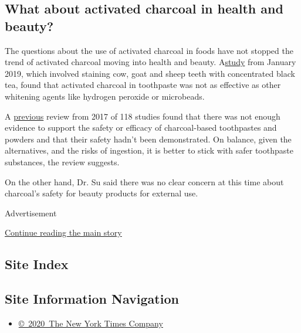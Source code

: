 \hypertarget{what-about-activated-charcoal-in-health-and-beauty}{%
\subsection{What about activated charcoal in health and
beauty?}\label{what-about-activated-charcoal-in-health-and-beauty}}

The questions about the use of activated charcoal in foods have not
stopped the trend of activated charcoal moving into health and beauty.
A\href{https://www.ncbi.nlm.nih.gov/pubmed/30673027}{study} from January
2019, which involved staining cow, goat and sheep teeth with
concentrated black tea, found that activated charcoal in toothpaste was
not as effective as other whitening agents like hydrogen peroxide or
microbeads.

A \href{https://www.ncbi.nlm.nih.gov/pubmed/28599961}{previous} review
from 2017 of 118 studies found that there was not enough evidence to
support the safety or efficacy of charcoal-based toothpastes and powders
and that their safety hadn't been demonstrated. On balance, given the
alternatives, and the risks of ingestion, it is better to stick with
safer toothpaste substances, the review suggests.

On the other hand, Dr. Su said there was no clear concern at this time
about charcoal's safety for beauty products for external use.

Advertisement

\protect\hyperlink{after-bottom}{Continue reading the main story}

\hypertarget{site-index}{%
\subsection{Site Index}\label{site-index}}

\hypertarget{site-information-navigation}{%
\subsection{Site Information
Navigation}\label{site-information-navigation}}

\begin{itemize}
\tightlist
\item
  \href{https://help.nytimes3xbfgragh.onion/hc/en-us/articles/115014792127-Copyright-notice}{©~2020~The
  New York Times Company}
\end{itemize}

